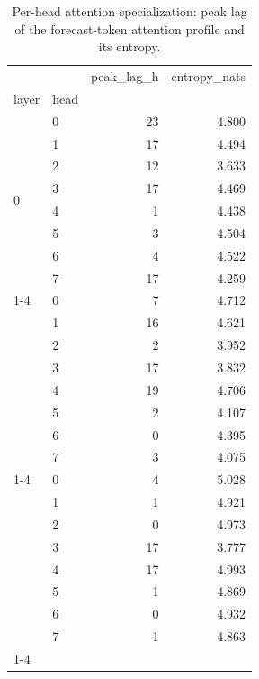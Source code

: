 \begin{table}
\caption{Per-head attention specialization: peak lag of the forecast-token attention profile and its entropy.}
\label{tab:heads}
\begin{tabular}{llrr}
\toprule
 &  & peak\_lag\_h & entropy\_nats \\
layer & head &  &  \\
\midrule
\multirow[t]{8}{*}{0} & 0 & 23 & 4.800 \\
 & 1 & 17 & 4.494 \\
 & 2 & 12 & 3.633 \\
 & 3 & 17 & 4.469 \\
 & 4 & 1 & 4.438 \\
 & 5 & 3 & 4.504 \\
 & 6 & 4 & 4.522 \\
 & 7 & 17 & 4.259 \\
\cline{1-4}
\multirow[t]{8}{*}{1} & 0 & 7 & 4.712 \\
 & 1 & 16 & 4.621 \\
 & 2 & 2 & 3.952 \\
 & 3 & 17 & 3.832 \\
 & 4 & 19 & 4.706 \\
 & 5 & 2 & 4.107 \\
 & 6 & 0 & 4.395 \\
 & 7 & 3 & 4.075 \\
\cline{1-4}
\multirow[t]{8}{*}{2} & 0 & 4 & 5.028 \\
 & 1 & 1 & 4.921 \\
 & 2 & 0 & 4.973 \\
 & 3 & 17 & 3.777 \\
 & 4 & 17 & 4.993 \\
 & 5 & 1 & 4.869 \\
 & 6 & 0 & 4.932 \\
 & 7 & 1 & 4.863 \\
\cline{1-4}
\bottomrule
\end{tabular}
\end{table}
